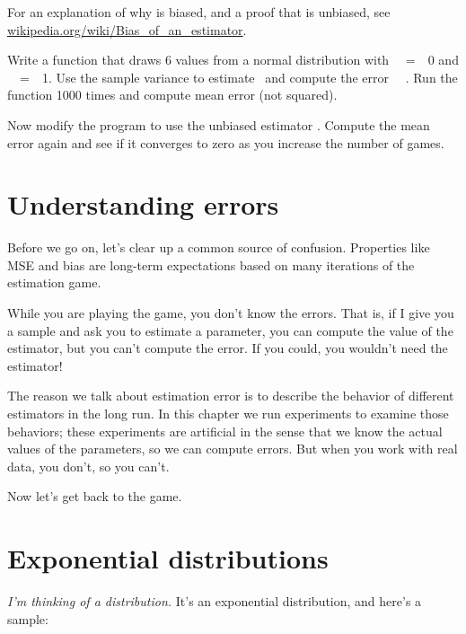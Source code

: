 \documentclass[12pt]{book}
\begin{document}
For an explanation of why \Ssq is biased, and a proof that
\Snsq is unbiased, see
\url{wikipedia.org/wiki/Bias_of_an_estimator}.

\begin{exercise}
Write a function that draws 6 values from a normal distribution with
\mymu~~=~~0 and \mysigma~~=~~1.  Use the sample variance to estimate
\sigmasq~and compute the error \Ssq~\minus~\mysigma{}.
Run the function 1000 times and compute mean error (not squared).

Now modify the program to use the unbiased estimator \Snsq.
Compute the mean error again and see if it converges to zero as you
increase the number of games.

\end{exercise}


\section{Understanding errors}

Before we go on, let's clear up a common source of confusion.
Properties like MSE and bias are long-term expectations based on
many iterations of the estimation game.

While you are playing the game, you don't know the errors.  That is,
if I give you a sample and ask you to estimate a parameter, you
can compute the value of the estimator, but you can't compute the
error.  If you could, you wouldn't need the estimator!

The reason we talk about estimation error is to describe the behavior
of different estimators in the long run.  In this chapter we run
experiments to examine those behaviors; these experiments are
artificial in the sense that we know the actual values of the
parameters, so we can compute errors.  But when you work with
real data, you don't, so you can't.

Now let's get back to the game.


\section{Exponential distributions}

{\em I'm thinking of a distribution.}  It's an exponential distribution, and 
here's a sample:
\end{document}
